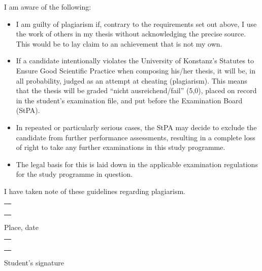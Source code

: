\documentclass[a4paper,11pt,xcolor=dvipsnames]{article}
\begin{document}
\thispagestyle{page2}

I am aware of the following:

\begin{itemize}[label=\color{kon4}--]
\item I am guilty of plagiarism if, contrary to the requirements set out above, I use the work of others in my thesis without acknowledging the precise source. This would be to lay claim to an achievement that is not my own.

\item If a candidate intentionally violates the University of Konstanz's Statutes to Ensure Good Scientific Practice when composing his/her thesis, it will be, in all probability, judged as an attempt at cheating (plagiarism). This means that the thesis will be graded \enquote{nicht ausreichend/fail} (5,0), placed on record in the student's examination file, and put before the Examination Board (StPA).

\item In repeated or particularly serious cases, the StPA may decide to exclude the candidate from further performance assessments, resulting in a complete loss of right to take any further examinations in this study programme.

\item The legal basis for this is laid down in the applicable examination regulations for the study programme in question.
\end{itemize}

I have taken note of these guidelines regarding plagiarism.

\vspace{0.75cm}

\begin{minipage}{0.3\textwidth}
    \begin{tabularx}{\textwidth}{|X|}
        \hline
        \\
        \\
        \\
        \\
        \hline
    \end{tabularx}
    Place, date
\end{minipage}\begin{minipage}{0.1\textwidth}
     \phantom{a}
\end{minipage}\begin{minipage}{0.6\textwidth}
    \begin{tabularx}{\textwidth}{|X|}
        \hline
        \\
        \\
        \\
        \\
        \hline
    \end{tabularx}
    \raggedleft Student's signature
\end{minipage}
\end{document}
